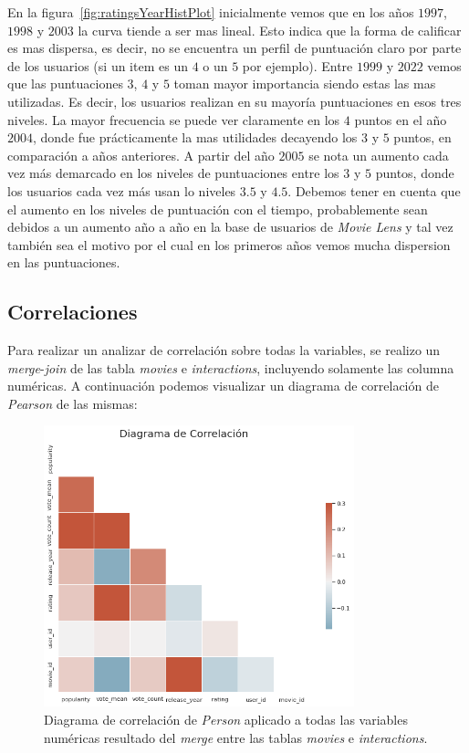 \documentclass[11pt,a4paper,twoside]{thesis}
\begin{document}
En la figura~\ref{fig:ratingsYearHistPlot} inicialmente vemos que en los años
$1997$, $1998$ y $2003$ la curva tiende a ser mas lineal. Esto indica que la
forma de calificar es mas dispersa, es decir, no se encuentra un perfil de
puntuación claro por parte de los usuarios (si un item es un $4$ o un $5$ por
ejemplo). Entre $1999$ y $2022$ vemos que las puntuaciones $3$, $4$ y $5$ toman
mayor importancia siendo estas las mas utilizadas. Es decir, los usuarios
realizan en su mayoría puntuaciones en esos tres niveles. La mayor frecuencia
se puede ver claramente en los $4$ puntos en el año $2004$, donde fue
prácticamente la mas utilidades decayendo los $3$ y $5$ puntos, en comparación
a años anteriores. A partir del año $2005$ se nota un aumento cada vez más
demarcado en los niveles de puntuaciones entre los $3$ y $5$ puntos, donde los
usuarios cada vez más usan lo niveles $3.5$ y $4.5$. Debemos tener en cuenta
que el aumento en los niveles de puntuación con el tiempo, probablemente sean
debidos a un aumento año a año en la base de usuarios de \textit{Movie Lens} y
tal vez también sea el motivo por el cual en los primeros años vemos mucha
dispersion en las puntuaciones.

\clearpage

\subsection{Correlaciones}

Para realizar un analizar de correlación sobre todas la variables, se realizo
un \textit{merge}-\textit{join} de las tabla \textit{movies} e
\textit{interactions}, incluyendo solamente las columna numéricas. A
continuación podemos visualizar un diagrama de correlación de \textit{Pearson}
de las mismas:

\begin{figure}[h!]
	\centering
	\includegraphics[width=9cm]{./images/Correlations.png}
	\caption{Diagrama de correlación de \textit{Person} aplicado a todas las variables numéricas resultado del \textit{merge} entre las tablas \textit{movies} e \textit{interactions}.}
	\label{fig:correlationPlot}
\end{figure}
\end{document}
